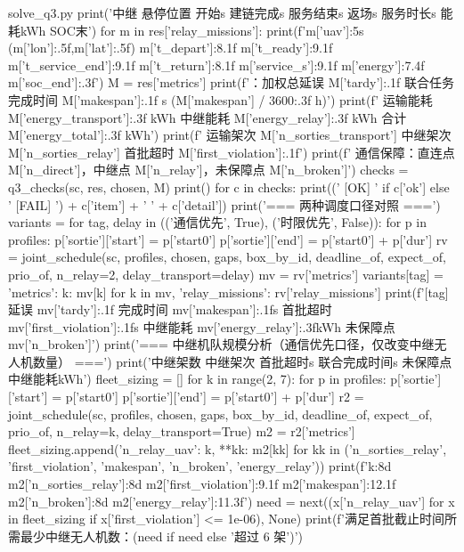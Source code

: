 \documentclass[bwprint]{gmcmthesis}
\begin{document}
\begin{appendices}
\begin{Python}{solve\_q3.py}
    print('中继  悬停位置            开始s   建链完成s 服务结束s 返场s   服务时长s 能耗kWh SOC末')
    for m in res['relay_missions']:
        print(f'{m['uav']:5s} ({m['lon']:.5f},{m['lat']:.5f}) {m['t_depart']:8.1f} {m['t_ready']:9.1f} {m['t_service_end']:9.1f} {m['t_return']:8.1f} {m['service_s']:9.1f} {m['energy']:7.4f} {m['soc_end']:.3f}')
    M = res['metrics']
    print(f'：加权总延误 {M['tardy']:.1f}  联合任务完成时间 {M['makespan']:.1f} s ({M['makespan'] / 3600:.3f} h)')
    print(f'  运输能耗 {M['energy_transport']:.3f} kWh  中继能耗 {M['energy_relay']:.3f} kWh  合计 {M['energy_total']:.3f} kWh')
    print(f'  运输架次 {M['n_sorties_transport']}  中继架次 {M['n_sorties_relay']}  首批超时 {M['first_violation']:.1f}')
    print(f'  通信保障：直连点 {M['n_direct']}，中继点 {M['n_relay']}，未保障点 {M['n_broken']}')
    checks = q3_checks(sc, res, chosen, M)
    print()
    for c in checks:
        print(('  [OK] ' if c['ok'] else '  [FAIL] ') + c['item'] + ' ' + c['detail'])
    print('\n=== 两种调度口径对照 ===')
    variants = {}
    for tag, delay in (('通信优先', True), ('时限优先', False)):
        for p in profiles:
            p['sortie']['start'] = p['start0']
            p['sortie']['end'] = p['start0'] + p['dur']
        rv = joint_schedule(sc, profiles, chosen, gaps, box_by_id, deadline_of, expect_of, prio_of, n_relay=2, delay_transport=delay)
        mv = rv['metrics']
        variants[tag] = {'metrics': {k: mv[k] for k in mv}, 'relay_missions': rv['relay_missions']}
        print(f'[{tag}] 延误 {mv['tardy']:.1f}  完成时间 {mv['makespan']:.1f}s 首批超时 {mv['first_violation']:.1f}s  中继能耗 {mv['energy_relay']:.3f}kWh 未保障点 {mv['n_broken']}')
    print('\n=== 中继机队规模分析（通信优先口径，仅改变中继无人机数量） ===')
    print('中继架数 中继架次 首批超时s 联合完成时间s 未保障点 中继能耗kWh')
    fleet_sizing = []
    for k in range(2, 7):
        for p in profiles:
            p['sortie']['start'] = p['start0']
            p['sortie']['end'] = p['start0'] + p['dur']
        r2 = joint_schedule(sc, profiles, chosen, gaps, box_by_id, deadline_of, expect_of, prio_of, n_relay=k, delay_transport=True)
        m2 = r2['metrics']
        fleet_sizing.append({'n_relay_uav': k, **{kk: m2[kk] for kk in ('n_sorties_relay', 'first_violation', 'makespan', 'n_broken', 'energy_relay')}})
        print(f'{k:8d} {m2['n_sorties_relay']:8d} {m2['first_violation']:9.1f} {m2['makespan']:12.1f} {m2['n_broken']:8d} {m2['energy_relay']:11.3f}')
    need = next((x['n_relay_uav'] for x in fleet_sizing if x['first_violation'] <= 1e-06), None)
    print(f'满足首批截止时间所需最少中继无人机数：{(need if need else '超过 6 架')}')

\end{Python}
\end{appendices}
\end{document}
